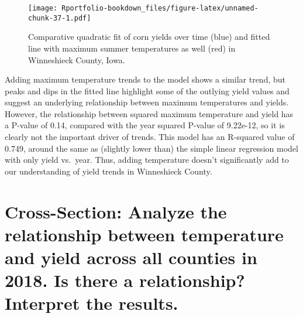 \documentclass[
]{book}
\begin{document}
\begin{figure}
\centering
\texttt{[image: Rportfolio-bookdown\_files/figure-latex/unnamed-chunk-37-1.pdf]}
\caption{\label{fig:unnamed-chunk-37}Comparative quadratic fit of corn yields over time (blue) and fitted line with maximum summer temperatures as well (red) in Winneshieck County, Iowa.}
\end{figure}

Adding maximum temperature trends to the model shows a similar trend, but peaks and dips in the fitted line highlight some of the outlying yield values and suggest an underlying relationship between maximum temperatures and yields. However, the relationship between squared maximum temperature and yield has a P-value of 0.14, compared with the year squared P-value of 9.22e-12, so it is clearly not the important driver of trends. This model has an R-squared value of 0.749, around the same as (slightly lower than) the simple linear regression model with only yield vs.~year. Thus, adding temperature doesn't significantly add to our understanding of yield trends in Winneshieck County.

\hypertarget{cross-section-analyze-the-relationship-between-temperature-and-yield-across-all-counties-in-2018.-is-there-a-relationship-interpret-the-results.}{%
\section{Cross-Section: Analyze the relationship between temperature and yield across all counties in 2018. Is there a relationship? Interpret the results.}\label{cross-section-analyze-the-relationship-between-temperature-and-yield-across-all-counties-in-2018.-is-there-a-relationship-interpret-the-results.}}
\end{document}
